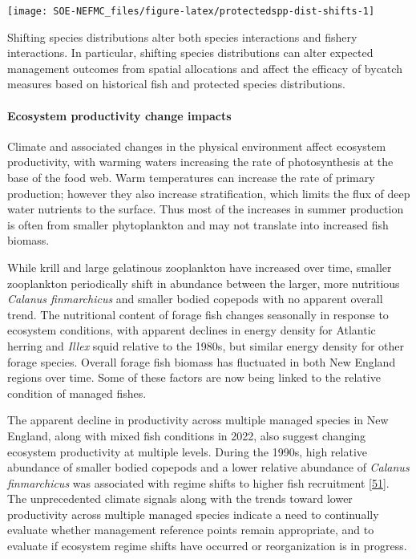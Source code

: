\documentclass[
  10pt,
]{article}
\let\origfigure\figure
\let\endorigfigure\endfigure
\renewenvironment{figure}[1][2] {
    \expandafter\origfigure\expandafter[H]
} {
    \endorigfigure
}
\begin{document}
\begin{figure}

{\centering \texttt{[image: SOE-NEFMC\_files/figure-latex/protectedspp-dist-shifts-1]} 

}

\caption{Direction and magnitude of core habitat shifts, represented by the length of the line of the seasonal weighted centroid for species with more than 70 km difference between 2010 and 2017 (tip of arrow).}\label{fig:protectedspp-dist-shifts}
\end{figure}

Shifting species distributions alter both species interactions and fishery interactions. In particular, shifting species distributions can alter expected management outcomes from spatial allocations and affect the efficacy of bycatch measures based on historical fish and protected species distributions.

\hypertarget{ecosystem-productivity-change-impacts}{%
\paragraph{Ecosystem productivity change impacts}\label{ecosystem-productivity-change-impacts}}

Climate and associated changes in the physical environment affect ecosystem productivity, with warming waters increasing the rate of photosynthesis at the base of the food web. Warm temperatures can increase the rate of primary production; however they also increase stratification, which limits the flux of deep water nutrients to the surface. Thus most of the increases in summer production is often from smaller phytoplankton and may not translate into increased fish biomass.

While krill and large gelatinous zooplankton have increased over time, smaller zooplankton periodically shift in abundance between the larger, more nutritious \emph{Calanus finmarchicus} and smaller bodied copepods with no apparent overall trend. The nutritional content of forage fish changes seasonally in response to ecosystem conditions, with apparent declines in energy density for Atlantic herring and \emph{Illex} squid relative to the 1980s, but similar energy density for other forage species. Overall forage fish biomass has fluctuated in both New England regions over time. Some of these factors are now being linked to the relative condition of managed fishes.

The apparent decline in productivity across multiple managed species in New England, along with mixed fish conditions in 2022, also suggest changing ecosystem productivity at multiple levels. During the 1990s, high relative abundance of smaller bodied copepods and a lower relative abundance of \emph{Calanus finmarchicus} was associated with regime shifts to higher fish recruitment {[}\protect\hyperlink{ref-perretti_regime_2017}{51}{]}. The unprecedented climate signals along with the trends toward lower productivity across multiple managed species indicate a need to continually evaluate whether management reference points remain appropriate, and to evaluate if ecosystem regime shifts have occurred or reorganization is in progress.
\end{document}

